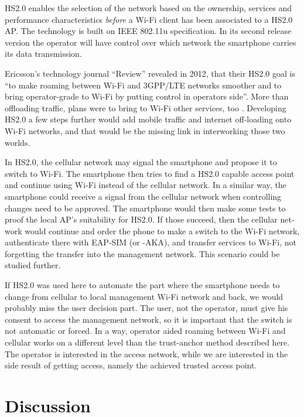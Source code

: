\documentclass[12pt,a4paper,english]{tutthesis}
\begin{document}
\begin{otherlanguage}{english}
HS2.0
enables the selection of the network based on the ownership, services and
performance characteristics \emph{before} a Wi-Fi client has been associated
to a HS2.0 AP. The technology is built on IEEE 802.11u specification. 
In its second release version the operator will
have control over which network the smartphone carries its data
transmission. 





Ericsson's technology journal ``Review'' revealed in 2012, that their 
HS2.0 goal is ``to make roaming between Wi-Fi and 3GPP/LTE networks smoother
and to bring operator-grade to Wi-Fi by putting control in operators side''. More
than offloading traffic, plans were to bring to Wi-Fi other services, too \cite{er-seamless}.
Developing HS2.0 a few steps further would add mobile traffic and internet
off-loading onto Wi-Fi networks, and that would be the missing link in
interworking those two worlds.



In HS2.0, the cellular network may signal the smartphone and
propose it to switch to Wi-Fi. The smartphone then tries to find a HS2.0 capable
access point and continue using Wi-Fi instead of the cellular network.
In a similar way, the smartphone could receive a signal from the cellular
network when controlling changes need to be approved. The smartphone
would then make some tests to proof the local AP's suitability for 
HS2.0. If those succeed, then the cellular network would continue and order the 
phone to make a switch to the Wi-Fi network, authenticate there with 
EAP-SIM (or -AKA), and transfer services to Wi-Fi, not forgetting 
the transfer into the management network. This scenario could be 
studied further.


If HS2.0 was used here to automate the part where
the smartphone needs to change from cellular to local
management Wi-Fi network and back, we would probably 
miss the user decision part. The user, not the operator,
 must give his consent to access the management network, so
it is important that the switch is not automatic or forced.
In a way, operator aided roaming between Wi-Fi and cellular
works on a different level than the trust-anchor method described here.
The operator is interested in the access network, while
we are interested in the side result of getting access, namely 
the achieved trusted access point.






\section{Discussion}
\label{sec-6-5}



\end{otherlanguage}
\end{document}
